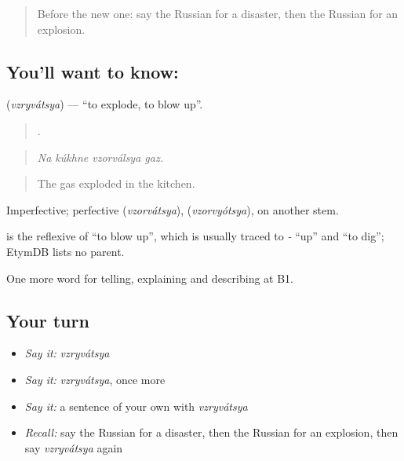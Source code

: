\label{lesson:RU-C301-vzryvatsya}



\begin{quote}
Before the new one: say the Russian for a disaster, then the Russian for an explosion.
\end{quote}

\subsection*{You'll want to know: }
\textbf{} (\emph{vzryvátsya}) — \textquotedblleft{}to explode, to blow up\textquotedblright{}.

\begin{quote}
   .
\end{quote}

\begin{quote}
\emph{Na kúkhne vzorválsya gaz.}
\end{quote}

\begin{quote}
The gas exploded in the kitchen.
\end{quote}

Imperfective; perfective \emph{} (\emph{vzorvátsya}), \emph{} (\emph{vzorvyótsya}), on another stem.

\begin{cousinweb}
\emph{} is the reflexive of \emph{} \textquotedblleft{}to blow up\textquotedblright{}, which is usually traced to \emph{-} \textquotedblleft{}up\textquotedblright{} and \emph{} \textquotedblleft{}to dig\textquotedblright{}; EtymDB lists no parent.
\end{cousinweb}

\begin{grammarlens}[title={What you've built}]
One more word for telling, explaining and describing at B1.
\end{grammarlens}

\subsection*{Your turn}
\begin{itemize}
\raggedright
  \item \emph{Say it:} \emph{vzryvátsya}
  \item \emph{Say it:} \emph{vzryvátsya}, once more
  \item \emph{Say it:} a sentence of your own with \emph{vzryvátsya}
  \item \emph{Recall:} say the Russian for a disaster, then the Russian for an explosion, then say \emph{vzryvátsya} again
\end{itemize}

